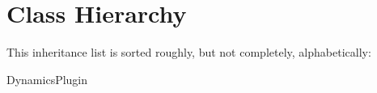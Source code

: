 \section{Class Hierarchy}
This inheritance list is sorted roughly, but not completely, alphabetically\+:\begin{DoxyCompactList}
\item Dynamics\+Plugin\begin{DoxyCompactList}
\item {}
\end{DoxyCompactList}
\end{DoxyCompactList}
